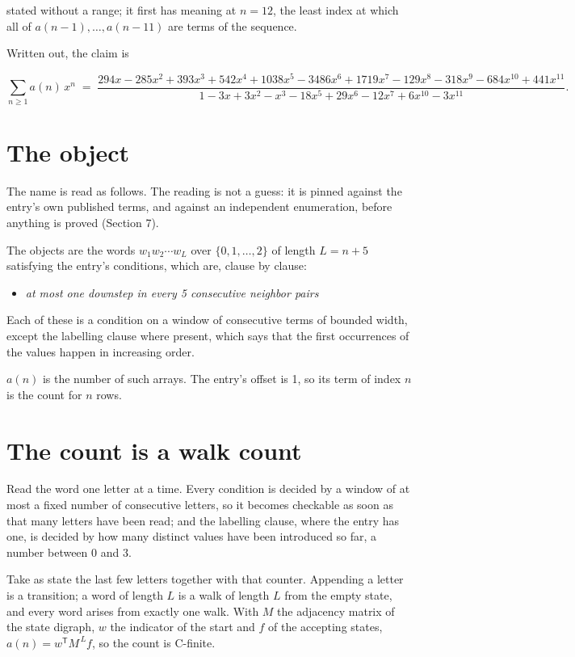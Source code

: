 \documentclass[11pt]{article}
\theoremstyle{definition}
\begin{document}
stated without a range; it first has meaning at $n = 12$, the least index at which all of $a(n-1),\dots,a(n-11)$ are terms of the sequence.

Written out, the claim is

\[\sum_{n \ge 1} a(n)\,x^n \;=\; \frac{294x - 285x^{2} + 393x^{3} + 542x^{4} + 1038x^{5} - 3486x^{6} + 1719x^{7} - 129x^{8} - 318x^{9} - 684x^{10} + 441x^{11}}{1 - 3x + 3x^{2} - x^{3} - 18x^{5} + 29x^{6} - 12x^{7} + 6x^{10} - 3x^{11}}.\]

\section{The object}

The name is read as follows. The reading is not a guess: it is pinned against the entry's own published terms, and against an independent enumeration, before anything is proved (Section 7).

The objects are the words $w_1 w_2 \cdots w_L$ over $\{0,1,\dots,2\}$ of length $L = n + 5$ satisfying the entry's conditions, which are, clause by clause:

\begin{itemize}

\item {\itshape at most one downstep in every 5 consecutive neighbor pairs}

\end{itemize}

Each of these is a condition on a window of consecutive terms of bounded width, except the labelling clause where present, which says that the first occurrences of the values happen in increasing order.

$a(n)$ is the number of such arrays. The entry's offset is 1, so its term of index $n$ is the count for $n$ rows.

\section{The count is a walk count}

Read the word one letter at a time. Every condition is decided by a window of at most a fixed number of consecutive letters, so it becomes checkable as soon as that many letters have been read; and the labelling clause, where the entry has one, is decided by how many distinct values have been introduced so far, a number between $0$ and 3.

Take as state the last few letters together with that counter. Appending a letter is a transition; a word of length $L$ is a walk of length $L$ from the empty state, and every word arises from exactly one walk. With $M$ the adjacency matrix of the state digraph, $w$ the indicator of the start and $f$ of the accepting states, $a(n) = w^{\mathsf T}M^{\,L}f$, so the count is C-finite.
\end{document}
